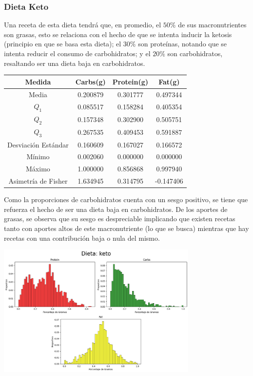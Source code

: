 \documentclass[12pt,a4paper]{article}
\begin{document}
    \subsubsection{Dieta Keto}
        Una receta de esta dieta tendrá que, en promedio, el $50\%$ de 
        sus macronutrientes son grasas, esto se relaciona con el hecho de 
        que se intenta inducir la ketosis (principio en que se basa esta         
        dieta); el $30\%$ son proteínas, notando que se intenta reducir 
        el consumo de carbohidratos; y el $20\%$ son carbohidratos, 
        resaltando ser una dieta baja en carbohidratos.
        \begin{center}
            \begin{tabular}{|c|ccc|}
                \hline
                Medida & Carbs(g) & Protein(g) & Fat(g) \\
                \hline
                Media               & 0.200879 & 0.301777 & 0.497344  \\
                $Q_1$               & 0.085517 & 0.158284 & 0.405354  \\
                $Q_2$               & 0.157348 & 0.302900 & 0.505751  \\
                $Q_3$               & 0.267535 & 0.409453 & 0.591887  \\
                Desviación Estándar & 0.160609 & 0.167027 & 0.166572  \\
                Mínimo              & 0.002060 & 0.000000 & 0.000000  \\
                Máximo              & 1.000000 & 0.856868 & 0.997940  \\
                Asimetría de Fisher & 1.634945 & 0.314795 & -0.147406 \\
                \hline
            \end{tabular}
        \end{center}
        Como la proporciones de carbohidratos cuenta con un sesgo positivo, se 
        tiene que refuerza el hecho de ser una dieta baja en carbohidratos. 
        De los aportes de grasas, se observa que su sesgo es despreciable implicando 
        que existen recetas tanto con aportes altos de este macronutriente (lo que se 
        busca) mientras que hay recetas con una contribución baja o nula del mismo.
        \begin{center}
            \includegraphics[width=0.75\textwidth]{Resources/2_03_plot_02.png}
        \end{center}
\end{document}
